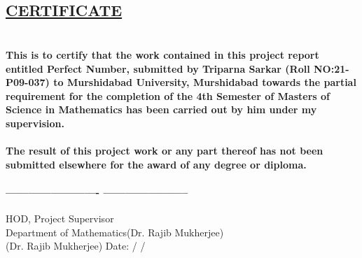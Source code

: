 \documentclass[12pt,,a4paper]{book}
\begin{document}
\begin{center}
    
\end{center}

\begin{center}
    
\section*{\color{blue}\underline {CERTIFICATE}}
\end{center}
\thispagestyle{empty}
\section*{}

\paragraph{
This is to certify that the work contained in this project report entitled \textbf{Perfect Number}, submitted by Triparna Sarkar (Roll NO:21-P09-037) to Murshidabad University, Murshidabad towards the partial requirement for the completion of the 4th Semester of Masters of Science in Mathematics has been carried out by him under my supervision. 
}
\paragraph{
The result of this project work or any part thereof has not been submitted elsewhere for the award of any degree or diploma.
} 




\paragraph{------------------------- \hspace{5cm}-----------------------
}
\vspace{1.5cm}

HOD, \hspace{8cm} Project Supervisor \\ Department of Mathematics\hspace{4cm}(Dr. Rajib Mukherjee)  \\ (Dr. Rajib Mukherjee)\hspace{5cm} Date:   /\hspace{0.5cm}   /
\vspace{1.5cm}
\end{document}
